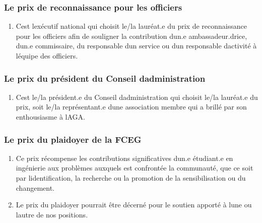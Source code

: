 \subsubsection{Le prix de reconnaissance pour les officiers}
\label{le-prix-de-reconnaissance-pour-les-officiers}

\begin{enumerate}
 \item
  C\textquotesingle est l\textquotesingle exécutif national qui choisit le/la lauréat.e du prix de reconnaissance pour les officiers afin de souligner la contribution d\textquotesingle un.e ambassadeur.drice, d\textquotesingle un.e commissaire, du responsable d\textquotesingle un service ou d\textquotesingle un responsable d\textquotesingle activité à l\textquotesingle équipe des officiers.
\end{enumerate}

\subsubsection{\texorpdfstring{Le prix du président du Conseil d\textquotesingle administration }{Le prix du président du Conseil d\textquotesingle administration }}\label{exorpdfstringle-prix-du-president-du-conseil-d-administration-le-prix-du-president-du-conseil-d-administration}

\begin{enumerate}
 \item
  C\textquotesingle est le/la président.e du Conseil d\textquotesingle administration qui choisit le/la lauréat.e du prix, soit le/la représentant.e d\textquotesingle une association membre qui a brillé par son enthousiasme à l\textquotesingle AGA.
\end{enumerate}

\subsubsection{Le prix du plaidoyer de la FCEG}
\label{le-prix-du-plaidoyer-de-la-fceg}

\begin{enumerate}
 \item
  Ce prix récompense les contributions significatives d\textquotesingle un.e étudiant.e en ingénierie aux problèmes auxquels est confrontée la communauté, que ce soit par l\textquotesingle identification, la recherche ou la promotion de la sensibilisation ou du changement.
 \item
  Le prix du plaidoyer pourrait être décerné pour le soutien apporté à l\textquotesingle une ou l\textquotesingle autre de nos positions.
\end{enumerate}

